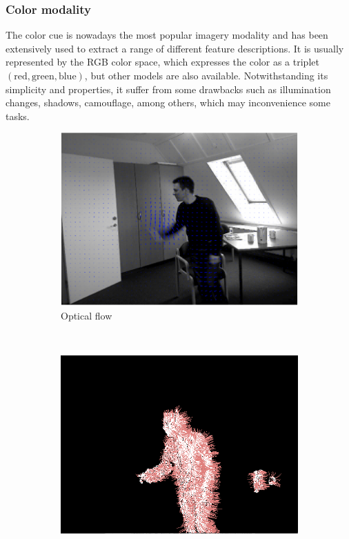 \documentclass[10pt,twocolumn,letterpaper]{article}
\begin{document}
\subsubsection{Color modality}
\label{sssec:color}

The color cue is nowadays the most popular imagery modality and has been extensively used to extract a range of different feature descriptions. It is usually represented by the RGB color space, which expresses the color as a triplet $(\text{red}, \text{green}, \text{blue})$, but other models are also available. Notwithstanding its simplicity and properties, it suffer from some drawbacks such as illumination changes, shadows, camouflage, among others, which may inconvenience some tasks.

\begin{figure}[ht]
	\center
        \begin{subfigure}[b]{0.33\textwidth}
                \includegraphics[width=\textwidth]{opticalflow_final.eps}
                \caption{Optical flow}
                \label{fig:opticalflow}
        \end{subfigure}\,
        \begin{subfigure}[b]{0.32\textwidth}
                \includegraphics[width=\textwidth]{normals.png}

\end{subfigure}
\end{figure}
\end{document}
